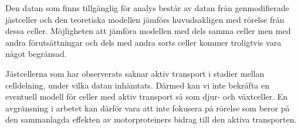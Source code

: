 Den datan som finns tillgänglig för analys består av datan från genmodifierade jästceller och den teoretiska modellen jämförs huvudsakligen med rörelse från dessa celler. Möjligheten att jämföra modellen med dels samma celler men med andra förutsättningar och dels med andra sorts celler kommer troligtvis vara något begränsad. 

Jästcellerna som har observerats saknar aktiv transport i stadier mellan celldelning, under vilka datan inhämtats. Därmed kan vi inte bekräfta en eventuell modell för celler med aktiv transport så som djur- och växtceller. En avgränsning i arbetet kan därför vara att inte fokusera på rörelse som beror på den sammanlagda effekten av motorproteiners bidrag till den aktiva transporten.